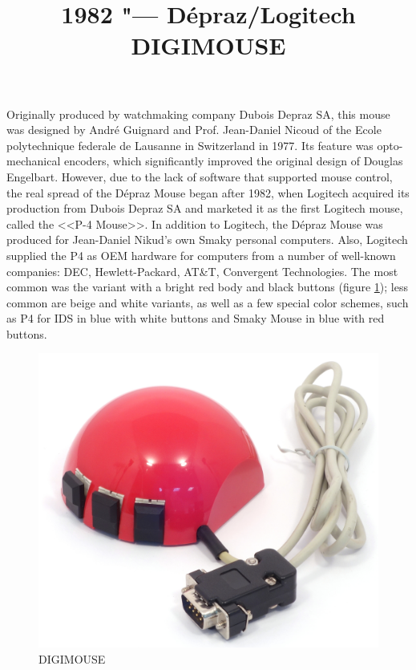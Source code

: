 \documentclass[11pt, a4paper]{article}
\begin{document}
\title{1982 "--- Dépraz/Logitech DIGIMOUSE}
\date{}
\maketitle

Originally produced by watchmaking company Dubois Depraz SA, this mouse was designed by André Guignard and Prof. Jean-Daniel Nicoud of the Ecole polytechnique federale de Lausanne in Switzerland in 1977. Its feature was opto-mechanical encoders, which significantly improved the original design of Douglas Engelbart. However, due to the lack of software that supported mouse control, the real spread of the Dépraz Mouse began after 1982, when Logitech acquired its production from Dubois Depraz SA and marketed it as the first Logitech mouse, called the <<P-4 Mouse>>.
In addition to Logitech, the Dépraz Mouse was produced for Jean-Daniel Nikud's own Smaky personal computers. Also, Logitech supplied the P4 as OEM hardware for computers from a number of well-known companies: DEC, Hewlett-Packard, AT\&T, Convergent Technologies. The most common was the variant with a bright red body and black buttons (figure \ref{fig:DIGIMOUSEP4Pic}); less common are beige and white variants, as well as a few special color schemes, such as P4 for IDS in blue with white buttons and Smaky Mouse in blue with red buttons.

\begin{figure}[h]
   \centering
    \includegraphics[scale=0.5]{1982_depraz_digimouse/pic_60.jpg}
    \caption{DIGIMOUSE}
    \label{fig:DIGIMOUSEP4Pic}
\end{figure}
\end{document}
